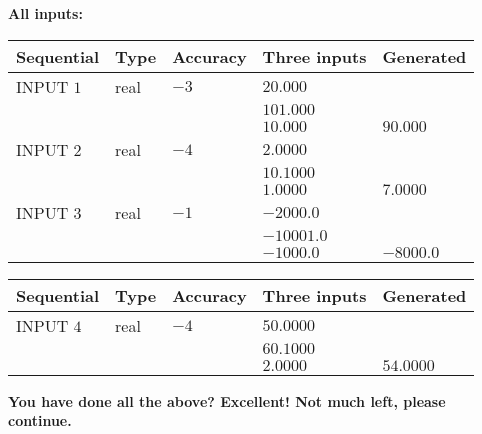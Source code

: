 \documentclass[12pt]{article}
\begin{document}
   
   
   
\noindent\vspace{0.1in}\hspace{-0.08in} {\textbf{\Large{All inputs: }}}
   
   
  
  
\noindent\begin{tabular}{|l|l|l|l|l|}
\hline
 Sequential & Type & Accuracy & Three inputs & Generated \\ 
\hline
 
 
  INPUT $           1$ & real & $          -3 $ & $
 20.000
  $ & \\
  & & &  $
 101.000
  $ & \\
  & & &  $
 10.000
 $ & $ 90.000 $ 
 \\  \hline  
 
 
  INPUT $           2$ & real & $          -4 $ & $
 2.0000
  $ & \\
  & & &  $
 10.1000
  $ & \\
  & & &  $
 1.0000
 $ & $ 7.0000 $ 
 \\  \hline  
 
 
  INPUT $           3$ & real & $          -1 $ & $
 -2000.0
  $ & \\
  & & &  $
 -10001.0
  $ & \\
  & & &  $
 -1000.0
 $ & $ -8000.0 $ 
 \\  \hline  
 \end{tabular}
   
   
  
  
\noindent\begin{tabular}{|l|l|l|l|l|}
\hline
 Sequential & Type & Accuracy & Three inputs & Generated \\ 
\hline
 
 
  INPUT $           4$ & real & $          -4 $ & $
 50.0000
  $ & \\
  & & &  $
 60.1000
  $ & \\
  & & &  $
 2.0000
 $ & $ 54.0000 $ 
 \\  \hline  
 \end{tabular}
   
   
   
   
\vspace{0.3in}
{\textbf{\LARGE{You have done all the above? Excellent! Not much left, please continue.}}}
\vspace{0.3in}
   
   
  
\vspace{0.2in}
  
\end{document}
